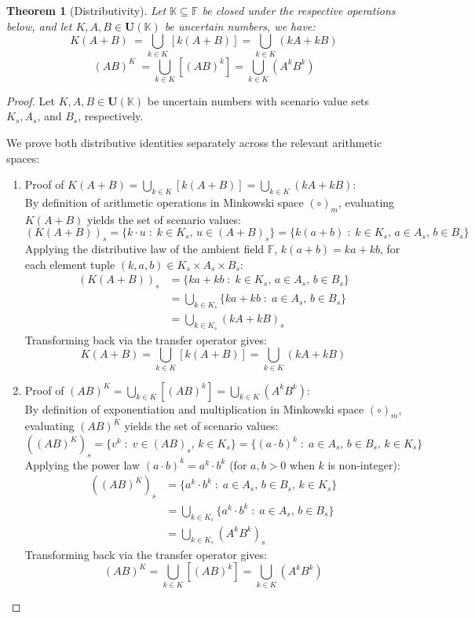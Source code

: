 \documentclass[a4paper,12pt,twoside]{memoir}
\newtheorem{theorem}{Theorem}[chapter]
\newcommand{\tsbd}[1]{\mathbf{U}(\mathbb{#1})}
\begin{document}
	\begin{theorem}[Distributivity]
		Let $\mathbb{K} \subseteq \mathbb{F}$ be closed under the respective operations below, and let $K,A,B \in \tsbd{K}$ be uncertain numbers, we have:
		\[K(A+B)\ = \bigcup_{k \in K} [k(A+B)] = \bigcup_{k \in K} (kA+kB)\]
		\[(AB)^K\ = \bigcup_{k \in K} \left[(AB)^k \right] = \bigcup_{k \in K} \left(A^kB^k\right) \]
	\end{theorem}
	\begin{proof}
		Let $K, A, B \in \tsbd{K}$ be uncertain numbers with scenario value sets $K_s, A_s$, and $B_s$, respectively.
		
		We prove both distributive identities separately across the relevant arithmetic spaces:
		
		\begin{enumerate}[leftmargin=*]
			\item Proof of $K(A + B) = \bigcup_{k \in K} [k(A + B)] = \bigcup_{k \in K} (kA + kB)$: \\
			By definition of arithmetic operations in Minkowski space $(\circ)_m$, evaluating $K(A + B)$ yields the set of scenario values:
			\[
			(K(A + B))_s = \{k \cdot u \;:\; k \in K_s, \, u \in (A + B)_s\} = \{k(a + b) \;:\; k \in K_s, \, a \in A_s, \, b \in B_s\}
			\]
			Applying the distributive law of the ambient field $\mathbb{F}$, $k(a + b) = ka + kb$, for each element tuple $(k, a, b) \in K_s \times A_s \times B_s$:
			\begin{align*}
				(K(A + B))_s & = \{ka + kb \;:\; k \in K_s, \, a \in A_s, \, b \in B_s\}       \\
				& = \bigcup_{k \in K_s} \{ka + kb \;:\; a \in A_s, \, b \in B_s\} \\
				& = \bigcup_{k \in K_s} (k A + k B)_s
			\end{align*}
			Transforming back via the transfer operator gives:
			\[
			K(A + B) = \bigcup_{k \in K} [k(A + B)] = \bigcup_{k \in K} (kA + kB)
			\]
			
			\item Proof of $(AB)^K = \bigcup_{k \in K} \left[(AB)^k\right] = \bigcup_{k \in K} \left(A^k B^k\right)$: \\
			By definition of exponentiation and multiplication in Minkowski space $(\circ)_m$, evaluating $(AB)^K$ yields the set of scenario values:
			\[
			((AB)^K)_s = \{v^k \;:\; v \in (AB)_s, \, k \in K_s\} = \{(a \cdot b)^k \;:\; a \in A_s, \, b \in B_s, \, k \in K_s\}
			\]
			Applying the power law $(a \cdot b)^k = a^k \cdot b^k$ (for $a, b > 0$ when $k$ is non-integer):
			\begin{align*}
				((AB)^K)_s & = \{a^k \cdot b^k \;:\; a \in A_s, \, b \in B_s, \, k \in K_s\}       \\
				& = \bigcup_{k \in K_s} \{a^k \cdot b^k \;:\; a \in A_s, \, b \in B_s\} \\
				& = \bigcup_{k \in K_s} (A^k B^k)_s
			\end{align*}
			Transforming back via the transfer operator gives:
			\[
			(AB)^K = \bigcup_{k \in K} \left[(AB)^k\right] = \bigcup_{k \in K} \left(A^k B^k\right)
			\]
		\end{enumerate}
		

\end{proof}
\end{document}
